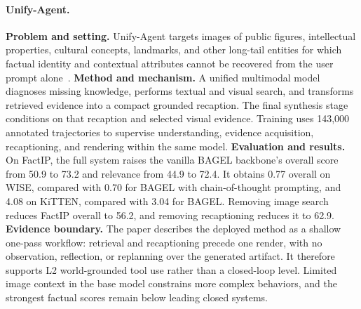 \paragraph{Unify-Agent.}
\textbf{Problem and setting.} Unify-Agent targets images of public figures, intellectual properties, cultural concepts, landmarks, and other long-tail entities for which factual identity and contextual attributes cannot be recovered from the user prompt alone~\cite{avg260329620}. \textbf{Method and mechanism.} A unified multimodal model diagnoses missing knowledge, performs textual and visual search, and transforms retrieved evidence into a compact grounded recaption. The final synthesis stage conditions on that recaption and selected visual evidence. Training uses 143,000 annotated trajectories to supervise understanding, evidence acquisition, recaptioning, and rendering within the same model. \textbf{Evaluation and results.} On FactIP, the full system raises the vanilla BAGEL backbone's overall score from 50.9 to 73.2 and relevance from 44.9 to 72.4. It obtains 0.77 overall on WISE, compared with 0.70 for BAGEL with chain-of-thought prompting, and 4.08 on KiTTEN, compared with 3.04 for BAGEL. Removing image search reduces FactIP overall to 56.2, and removing recaptioning reduces it to 62.9. \textbf{Evidence boundary.} The paper describes the deployed method as a shallow one-pass workflow: retrieval and recaptioning precede one render, with no observation, reflection, or replanning over the generated artifact. It therefore supports L2 world-grounded tool use rather than a closed-loop level. Limited image context in the base model constrains more complex behaviors, and the strongest factual scores remain below leading closed systems.

